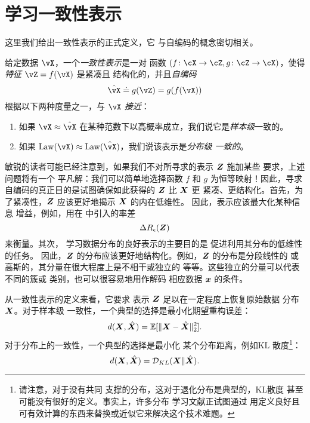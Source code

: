\documentclass[../../book-main_zh.tex]{subfiles}
\begin{document}
\section{学习一致性表示}\label{sec:consistent-representation}

这里我们给出一致性表示的正式定义，它
与自编码的概念密切相关。%
\begin{definition}[一致性表示]\label{def:bidirectional_rep}
  给定数据 \(\vX\)，一个\textit{一致性表示}是一对
  函数 \((f \colon \cX \to \cZ, g \colon \cZ \to \cX)\)，使得
  \textit{特征} \(\vZ = f(\vX)\) 是紧凑且
  结构化的，并且\textit{自编码}
  \begin{equation}
    \hat{\vX} \doteq g(\vZ) = g(f(\vX))
  \end{equation}
  根据以下两种度量之一，与 \(\vX\) \textit{接近}：
  \begin{enumerate}
    \item 如果 \(\vX
      \approx \hat{\vX}\) 在某种范数下以高概率成立，我们说它是\textit{样本级}一致的。
    \item 如果 \(\Law(\vX) \approx \Law(\hat{\vX})\)，我们说该表示是\textit{分布级
      一致的}。
  \end{enumerate}
\end{definition}

敏锐的读者可能已经注意到，如果我们不对所寻求的表示 $\bm{Z}$ 施加某些
要求，上述问题将有一个
平凡解：我们可以简单地选择函数 $f$ 和 $g$
为恒等映射！因此，寻求
自编码的真正目的是试图确保如此获得的 $\bm{Z}$ 比 $\bm{X}$ 更
紧凑、更结构化。首先，为了紧凑性，$\bm{Z}$
应该更好地揭示 $\bm{X}$ 的内在低维性。
因此，表示应该最大化某种信息
增益，例如，用在  中引入的率差
\begin{equation}
  \Delta R_{\epsilon}(\bm{Z})
\end{equation}
来衡量。其次，
学习数据分布的良好表示的主要目的是
促进利用其分布的低维性的任务。
因此，$\bm{Z}$ 的分布应该更好地结构化。例如，$\bm{Z}$ 的分布是分段线性的
或高斯的，其分量在很大程度上是不相干或独立的
等等。这些独立的分量可以代表不同的簇或
类别，也可以很容易地用作解码
相应数据 $\bm{x}$ 的条件。

从一致性表示的定义来看，它要求
表示 $\bm{Z}$ 足以在一定程度上恢复原始数据
分布 $\bm{X}$。对于样本级
一致性，一个典型的选择是最小化期望重构误差：
\begin{equation}
  d(\bm{X}, \hat {\bm{X}}) = \mathbb{E}[\|\bm{X} - \hat{\bm{X}}\|_2^2].
\end{equation}
对于分布上的一致性，一个典型的选择是最小化
某个分布距离，例如KL
散度\footnote{请注意，对于没有共同
  支撑的分布，这对于退化分布是典型的，KL散度
  甚至可能没有很好的定义。事实上，许多分布
  学习文献正试图通过
  用定义良好且可有效计算的东西来替换或近似它来解决这个技术难题。}：
\begin{equation}
  d(\bm{X}, \hat {\bm{X}}) = \mathcal{D}_{KL}(\bm{X}\|\hat{\bm{X}}).
\end{equation}
\end{document}
